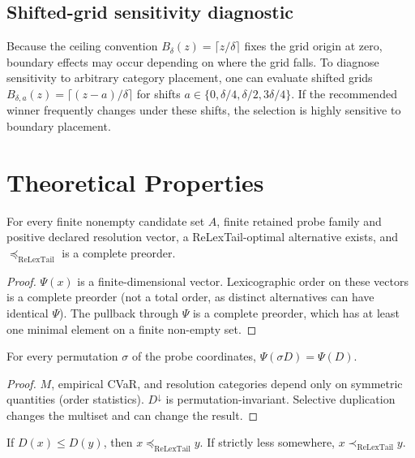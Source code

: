 \subsection{Shifted-grid sensitivity diagnostic}
Because the ceiling convention $B_\delta(z) = \lceil z/\delta \rceil$ fixes the grid origin at zero, boundary effects may occur depending on where the grid falls. To diagnose sensitivity to arbitrary category placement, one can evaluate shifted grids $B_{\delta, a}(z) = \lceil (z-a)/\delta \rceil$ for shifts $a \in \{0, \delta/4, \delta/2, 3\delta/4\}$. If the recommended winner frequently changes under these shifts, the selection is highly sensitive to boundary placement.

\section{Theoretical Properties}
\label{sec:theory}

\begin{theorem}
For every finite nonempty candidate set $A$, finite retained probe family and positive declared resolution vector, a ReLexTail-optimal alternative exists, and $\preceq_{\mathrm{ReLexTail}}$ is a complete preorder.
\end{theorem}
\begin{proof}
$\Psi(x)$ is a finite-dimensional vector. Lexicographic order on these vectors is a complete preorder (not a total order, as distinct alternatives can have identical $\Psi$). The pullback through $\Psi$ is a complete preorder, which has at least one minimal element on a finite non-empty set.
\end{proof}

\begin{theorem}
For every permutation $\sigma$ of the probe coordinates, $\Psi(\sigma D) = \Psi(D)$.
\end{theorem}
\begin{proof}
$M$, empirical CVaR, and resolution categories depend only on symmetric quantities (order statistics). $D^\downarrow$ is permutation-invariant. Selective duplication changes the multiset and can change the result.
\end{proof}

\begin{proposition}
If $D(x) \leq D(y)$, then $x \preceq_{\mathrm{ReLexTail}} y$. If strictly less somewhere, $x \prec_{\mathrm{ReLexTail}} y$.
\end{proposition}

